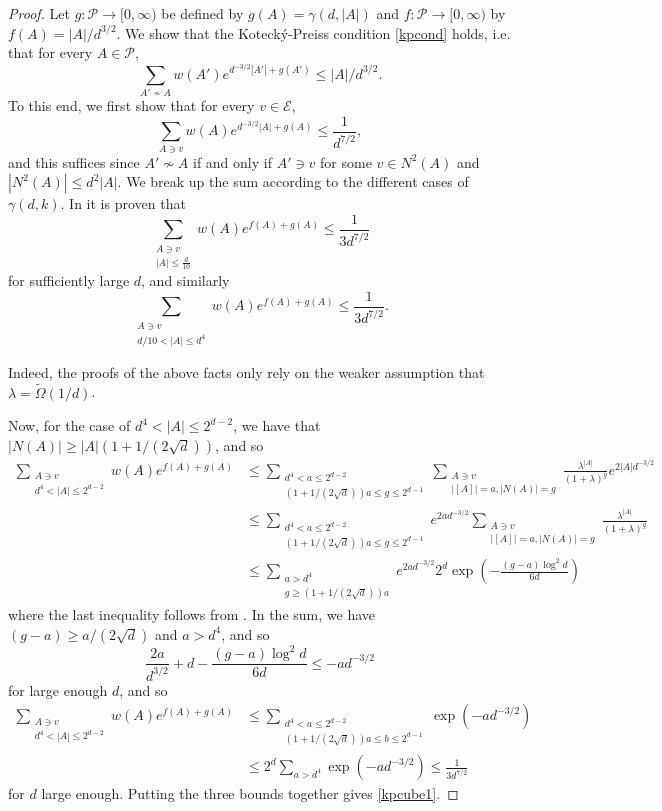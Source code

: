\documentclass[a4paper]{amsart}
\theoremstyle{definition}
\newcommand{\cE}{\mathcal{E} }
\newcommand{\cP}{\mathcal{P} }
\newcommand{\beq}[1]{\begin{equation}\label{#1}}
\newcommand{\enq}[0]{\end{equation}}
\newcommand{\nin}[0]{\noindent}
\newcommand{\0}[0]{\emptyset}
\newcommand{\lam}{\lambda}
\begin{document}
\begin{proof}
    Let $g:\cP\rightarrow[0, \infty)$ be defined by $g(A)=\gamma(d, |A|)$ and $f:\cP\rightarrow[0, \infty)$ by $f(A)=|A|/d^{3/2}$. We show that the Koteck\'y-Preiss condition \eqref{kpcond} holds, i.e. that for every $A\in\cP$,
    \beq{kpcube1} \sum_{A'\not\sim A} w(A')e^{d^{-3/2}|A'| + g(A')}\leq |A|/d^{3/2}. \enq
    To this end, we first show that for every $v\in\cE$,
    \[ \sum_{A \ni v} w(A)e^{d^{-3/2}|A|+g(A)} \leq \frac{1}{d^{7/2}},\]
    and this suffices since $A'\not\sim A$ if and only if $A'\ni v$ for some $v\in N^2(A)$ and $|N^2(A)|\leq d^2|A|$. We break up the sum according to the different cases of $\gamma(d, k)$.
    In \cite[Lemma 15]{hypercube} it is proven that
    \[ \sum_{\substack{A\ni v \\ |A|\leq\frac{d}{10}}} w(A)e^{f(A)+g(A)}\leq \frac{1}{3d^{7/2}}\]
    for sufficiently large $d$, and similarly
    \[ \sum_{\substack{A\ni v \\ d/10< |A|\leq d^4}} w(A)e^{f(A)+g(A)} \leq \frac{1}{3d^{7/2}}.\]

\nin    Indeed, the proofs of the above facts only rely on the weaker assumption that $\lam=\tilde{\Omega}(1/d)$.

    Now, for the case of $d^4<|A|\leq 2^{d-2}$, we have that $|N(A)|\geq |A|(1+1/(2\sqrt{d}))$, and so
    \begin{align*} \sum_{\substack{A\ni v\\ d^4<|A|\leq 2^{d-2}}} w(A)e^{f(A)+g(A)} &\leq \sum_{\substack{ d^4<a\leq 2^{d-2} \\ (1+1/(2\sqrt{d}))a\leq g\leq 2^{d-1}}} \sum_{\substack{A\ni v \\ |[A]|=a, |N(A)|=g}} \frac{\lam^{|A|}}{(1+\lam)^g} e^{2|A|d^{-3/2}} \\ &\leq \sum_{\substack{ d^4<a\leq 2^{d-2} \\ (1+1/(2\sqrt{d}))a\leq g\leq 2^{d-1}}} e^{2ad^{-3/2}} \sum_{\substack{A\ni v \\ |[A]|=a, |N(A)|=g}} \frac{\lam^{|A|}}{(1+\lam)^g} \\ &\leq \sum_{\substack{a>d^4 \\ g\geq (1+1/(2\sqrt{d}))a}} e^{2ad^{-3/2}} 2^d \exp\left( -\frac{(g-a)\log^2 d}{6d}\right)
    \end{align*}
    where the last inequality follows from . In the sum, we have $(g-a)\geq a/(2\sqrt{d})$ and $a>d^4$, and so
    \[ \frac{2a}{d^{3/2}} + d - \frac{(g-a)\log^2d}{6d} \leq -ad^{-3/2}\]
    for large enough $d$, and so
    \begin{align*} \sum_{\substack{A\ni v \\ d^4<|A|\leq 2^{d-2}}} w(A)e^{f(A)+g(A)} &\leq \sum_{\substack{d^4<a\leq 2^{d-2} \\ (1+1/(2\sqrt{d}))a\leq b\leq 2^{d-1}}} \exp(-ad^{-3/2}) \\ &\leq 2^d \sum_{a>d^4} \exp(-ad^{-3/2}) \leq \frac{1}{3d^{7/2}}
    \end{align*}
    for $d$ large enough. Putting the three bounds together gives \eqref{kpcube1}.


\end{proof}
\end{document}
